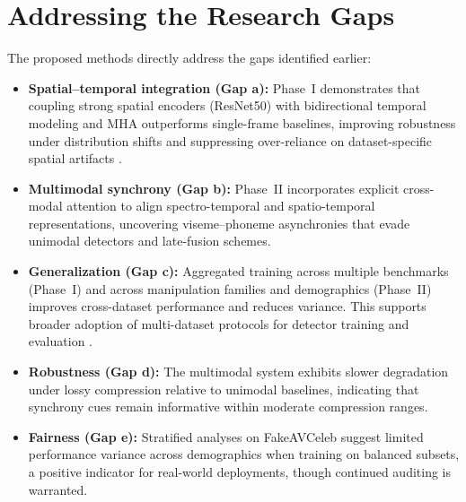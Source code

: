 \section{Addressing the Research Gaps}
The proposed methods directly address the gaps identified earlier:
\begin{itemize}
    \item \textbf{Spatial--temporal integration (Gap a):} Phase~I demonstrates that coupling strong spatial encoders (ResNet50) with bidirectional temporal modeling and MHA outperforms single-frame baselines, improving robustness under distribution shifts and suppressing over-reliance on dataset-specific spatial artifacts \cite{rossler2019faceforensics,afchar2018mesonet}.
    \item \textbf{Multimodal synchrony (Gap b):} Phase~II incorporates explicit cross-modal attention to align spectro-temporal and spatio-temporal representations, uncovering viseme--phoneme asynchronies that evade unimodal detectors and late-fusion schemes.
    \item \textbf{Generalization (Gap c):} Aggregated training across multiple benchmarks (Phase~I) and across manipulation families and demographics (Phase~II) improves cross-dataset performance and reduces variance. This supports broader adoption of multi-dataset protocols for detector training and evaluation \cite{mubarak2023survey,gong2024survey}.
    \item \textbf{Robustness (Gap d):} The multimodal system exhibits slower degradation under lossy compression relative to unimodal baselines, indicating that synchrony cues remain informative within moderate compression ranges.
    \item \textbf{Fairness (Gap e):} Stratified analyses on FakeAVCeleb suggest limited performance variance across demographics when training on balanced subsets, a positive indicator for real-world deployments, though continued auditing is warranted.
\end{itemize}

